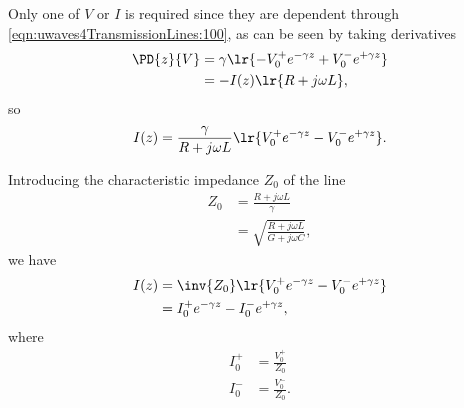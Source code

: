 Only one of \( V \) or \( I \) is required since they are dependent through \cref{eqn:uwaves4TransmissionLines:100}, as can be seen by taking derivatives
\begin{equation}\label{eqn:uwaves4TransmissionLines:220}
\begin{aligned}
\PD{z}{V}
&= \gamma \lr{ -V_0^{+} e^{-\gamma z} + V_0^{-} e^{+\gamma z} }
\\ &=
-I(z) \lr{ R + j \omega L },
\end{aligned}
\end{equation}
so
\begin{equation}\label{eqn:uwaves4TransmissionLines:240}
I(z)
=
\frac{\gamma}{ R + j \omega L } \lr{ V_0^{+} e^{-\gamma z} - V_0^{-} e^{+\gamma z} }.
\end{equation}

Introducing the characteristic impedance \( Z_0 \) of the line
\begin{equation}\label{eqn:uwaves4TransmissionLines:260}
\begin{aligned}
Z_0
&= \frac{R + j \omega L}{\gamma}
\\ &= \sqrt{ \frac{R + j \omega L}{G + j \omega C} },
\end{aligned}
\end{equation}
we have
\begin{equation}\label{eqn:uwaves4TransmissionLines:280}
\begin{aligned}
I(z)
&=
\inv{Z_0} \lr{ V_0^{+} e^{-\gamma z} - V_0^{-} e^{+\gamma z} }
\\ &=
I_0^{+} e^{-\gamma z} - I_0^{-} e^{+\gamma z},
\end{aligned}
\end{equation}
where
\begin{equation}\label{eqn:uwaves4TransmissionLines:300}
\begin{aligned}
I_0^{+} &= \frac{V_0^{+}}{Z_0} \\
I_0^{-} &= \frac{V_0^{-}}{Z_0}.
\end{aligned}
\end{equation}
